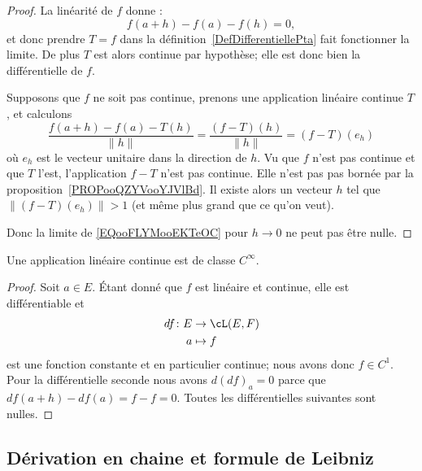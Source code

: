 \begin{proof}
	La linéarité de \( f\) donne :
	\begin{equation}
		f(a+h)-f(a)-f(h)=0,
	\end{equation}
	et donc prendre \( T=f\) dans la définition~\ref{DefDifferentiellePta} fait fonctionner la limite. De plus \( T\) est alors continue par hypothèse; elle est donc bien la différentielle de \( f\).

	Supposons que \( f\) ne soit pas continue, prenons une application linéaire continue \( T\), et calculons
	\begin{equation}        \label{EQooFLYMooEKTeOC}
		\frac{ f(a+h)-f(a)-T(h) }{ \| h \| }=\frac{ (f-T)(h) }{ \| h \| }=(f-T)(e_h)
	\end{equation}
	où \( e_h\) est le vecteur unitaire dans la direction de \( h\). Vu que \( f\) n'est pas continue et que \( T\) l'est, l'application \( f-T\) n'est pas continue. Elle n'est pas pas bornée par la proposition~\ref{PROPooQZYVooYJVlBd}. Il existe alors un vecteur \( h\) tel que \( \| (f-T)(e_h) \|>1\) (et même plus grand que ce qu'on veut).

	Donc la limite de \eqref{EQooFLYMooEKTeOC} pour \( h\to 0\) ne peut pas être nulle.
\end{proof}

\begin{lemma}   \label{LemLLvgPQW}
	Une application linéaire continue est de classe \(  C^{\infty}\).
\end{lemma}

\begin{proof}
	Soit \( a\in E\). Étant donné que \( f\) est linéaire et continue, elle est différentiable et
	\begin{equation}
		\begin{aligned}
			df\colon E & \to \cL(E,F) \\
			a          & \mapsto f
		\end{aligned}
	\end{equation}
	est une fonction constante et en particulier continue; nous avons donc \( f\in C^1\). Pour la différentielle seconde nous avons \( d(df)_a=0\) parce que \( df(a+h)-df(a)=f-f=0\). Toutes les différentielles suivantes sont nulles.
\end{proof}

\subsection{Dérivation en chaine et formule de Leibniz}

